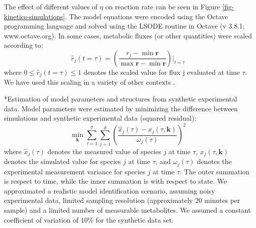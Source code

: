\documentclass[12pt]{article}
\makeatletter
\renewcommand\subsection{\@startsection
	{subsection}{2}{0mm}
	{-0.05in}
	{-0.5\baselineskip}
	{\normalfont\normalsize\bfseries}}
\makeatother
\begin{document}
The effect of different values of $\eta$ on reaction rate can be seen in Figure \ref{fig-kinetics-simulations}.
The model equations were encoded using the Octave programming language and solved using the LSODE routine in Octave (v 3.8.1; www.octave.org). 
In some cases, metabolic fluxes (or other quantities) were scaled according to:
\begin{equation}
	\hat{r}_{j}\left(t = \tau\right) = \left(\frac{r_{j} - \min\mathbf{r}}{\max\mathbf{r} - \min\mathbf{r}}\right)\Bigr|_{t = \tau}
\end{equation}where $0\leq\hat{r}_{j}\left(t = \tau\right)\leq{1}$ denotes the scaled value for flux j evaluated at time $\tau$. 
We have used this scaling in a variety of other contexts \citep{Song:2010ab,Lequieu:2011aa}.

\subsection*{Estimation of model parameters and structures from synthetic experimental data.}
Model parameters were estimated by minimizing the difference between simulations and synthetic experimental data (squared residual):
\begin{equation}\label{eqn:objective-function}
	\min_{\mathbf{k}} \sum_{\tau=1}^{\mathcal{T}}\sum_{j=1}^{\mathcal{S}}\left(\frac{\hat{x}_{j}\left(\tau\right) - x_{j}\left(\tau,\mathbf{k}\right)}{\omega_{j}\left(\tau\right)}\right)^{2}
\end{equation}where $\hat{x}_{j}\left(\tau\right)$ denotes the measured value of species $j$ at time $\tau$, $x_{j}\left(\tau,\mathbf{k}\right)$ denotes the simulated 
value for species $j$ at time $\tau$, and $\omega_{j}\left(\tau\right)$ denotes the experimental measurement variance for species $j$ at time $\tau$. The outer summation is respect to
time, while the inner summation is with respect to state. We approximated a realistic model identification scenario, assuming noisy experimental data, 
limited sampling resolution (approximately 20 minutes per sample) and a limited number of measurable metabolites. We assumed a constant coefficient of variation of 10\% for the synthetic data set.
\end{document}
